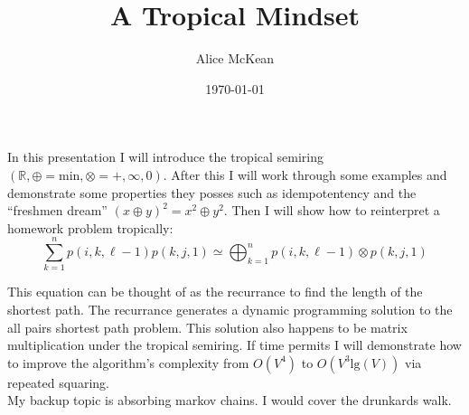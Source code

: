 \documentclass[12pt]{extarticle}
\title{A Tropical Mindset}
\author{Alice McKean}
\date{\today}
\begin{document}
\maketitle

\noindent
In this presentation I will introduce the tropical semiring
$(\mathbb{R},\oplus=\text{min},\otimes=+,\infty,0)$.
\cite{mohri,speyer}
After this I will work through some examples and demonstrate some
properties they posses such as idempotentency and the ``freshmen dream''
$(x \oplus y)^2 = x^2 \oplus y^2$. Then I will show how to reinterpret a
homework problem tropically:
\begin{equation*}
  \sum_{k=1}^np(i,k,\ell - 1)p(k,j,1) \simeq \bigoplus_{k=1}^{n} p(i,k,\ell - 1)\otimes p(k,j,1)
\end{equation*}

\noindent
This equation can be thought of as the recurrance to find the length of the shortest path.
The recurrance generates a dynamic programming solution to the all pairs shortest path problem.
This solution also happens to be matrix multiplication under the tropical
semiring. \cite{mohri,antimatroid}
If time permits I will demonstrate how to improve the algorithm's complexity
from $O(V^4)$ to $O(V^3\text{lg}(V))$ via repeated squaring. \\

\noindent
My backup topic is absorbing markov chains. I would cover the drunkards walk.



\end{document}
